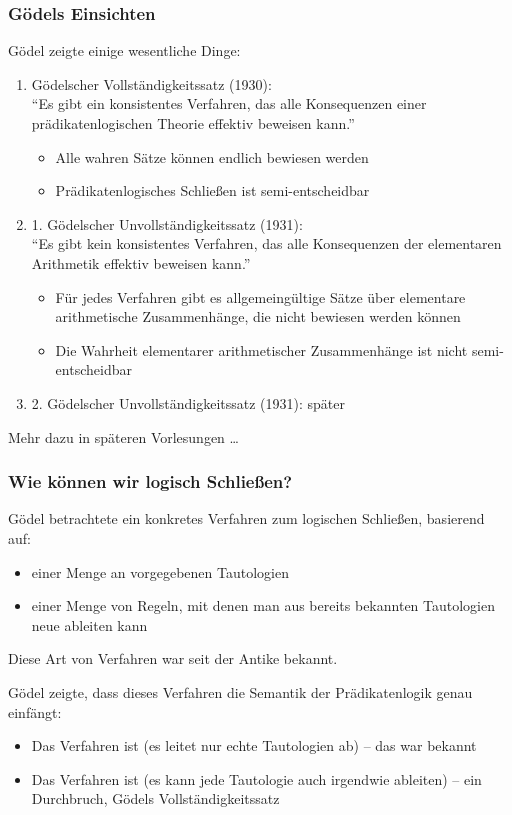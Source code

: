 \documentclass[aspectratio=1610,onlymath]{beamer}
\begin{document}
\begin{frame}\frametitle{Gödels Einsichten}

Gödel zeigte einige wesentliche Dinge:
\begin{enumerate}[(1)]
\item \alert{Gödelscher Vollständigkeitssatz (1930):}\\
"`Es gibt ein konsistentes Verfahren, das alle Konsequenzen einer prädikatenlogischen Theorie
effektiv beweisen kann."'
\begin{itemize}
\item Alle wahren Sätze können endlich bewiesen werden
\item Prädikatenlogisches Schließen ist semi-entscheidbar
\end{itemize}\pause
%
\item \alert{1. Gödelscher Unvollständigkeitssatz (1931):} \\
"`Es gibt kein konsistentes Verfahren, das alle Konsequenzen der elementaren Arithmetik
effektiv beweisen kann."'
\begin{itemize}
\item Für jedes Verfahren gibt es allgemeingültige Sätze über elementare arithmetische Zusammenhänge, die nicht bewiesen werden können
\item Die Wahrheit elementarer arithmetischer Zusammenhänge ist nicht semi-entscheidbar
\end{itemize}\pause
\item \alert{2. Gödelscher Unvollständigkeitssatz (1931):} später
\end{enumerate}

Mehr dazu in späteren Vorlesungen \ldots

\end{frame}


\begin{frame}\frametitle{Wie können wir logisch Schließen?}

Gödel betrachtete ein konkretes Verfahren zum logischen Schließen,
basierend auf:
\begin{itemize}
\item einer Menge an vorgegebenen Tautologien
\item einer Menge von Regeln, mit denen man aus bereits bekannten Tautologien
neue ableiten kann
\end{itemize}
\alert{Diese Art von Verfahren war seit der Antike bekannt.}
\bigskip\pause

Gödel zeigte, dass dieses Verfahren die Semantik der Prädikatenlogik genau
einfängt:
\begin{itemize}
\item Das Verfahren ist  (es leitet nur echte Tautologien ab) -- das war bekannt
\item Das Verfahren ist  (es kann jede Tautologie auch irgendwie ableiten) -- ein Durchbruch, Gödels Vollständigkeitssatz
\end{itemize}

\end{frame}
\end{document}
